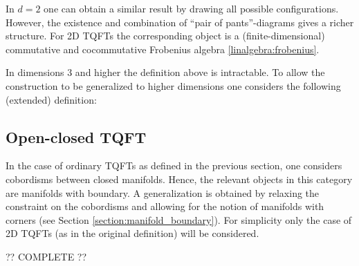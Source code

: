     \begin{example}[2D]
        In $d=2$ one can obtain a similar result by drawing all possible configurations. However, the existence and combination of ``pair of pants''-diagrams gives a richer structure. For 2D TQFTs the corresponding object is a (finite-dimensional) commutative and cocommutative Frobenius algebra \ref{linalgebra:frobenius}.
    \end{example}

    In dimensions 3 and higher the definition above is intractable. To allow the construction to be generalized to higher dimensions one considers the following (extended) definition:

\subsection{Open-closed TQFT}

    In the case of ordinary TQFTs as defined in the previous section, one considers cobordisms between closed manifolds. Hence, the relevant objects in this category are manifolds with boundary. A generalization is obtained by relaxing the constraint on the cobordisms and allowing for the notion of manifolds with corners (see Section \ref{section:manifold_boundary}). For simplicity only the case of 2D TQFTs (as in the original definition) will be considered.

    ?? COMPLETE ??